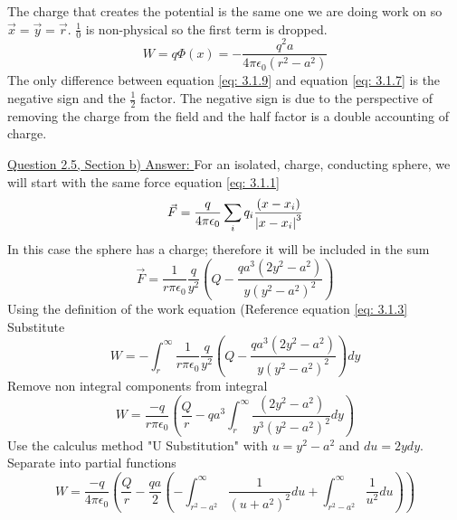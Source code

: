 \documentclass[12pt]{article}
\begin{document}
    The charge that creates the potential is the same one we are doing work on so $\vec{x} = \vec{y} = \vec{r}$. $\frac{1}{0}$ is non-physical so the first term is dropped.
    \begin{equation} \label{eq: 3.1.9}
        W = q \Phi(x) = -\frac{q^2 a}{4 \pi \epsilon_0 (r^2 - a^2)} 
    \end{equation}
    The only difference between equation \ref{eq: 3.1.9} and equation \ref{eq: 3.1.7} is the negative sign and the $\frac{1}{2}$ factor. The negative sign is due to the perspective of removing the charge from the field and the half factor is a double accounting of charge.

    \underline{Question 2.5, Section b) Answer: }
    \newline 
    For an isolated, charge, conducting sphere, we will start with the same force equation \ref{eq: 3.1.1}
    \begin{gather*}
        \vec{F} = \frac{q}{4 \pi \epsilon_0} \sum_i q_i \frac{(x-x_i)}{\abs{x-x_i}^3}
    \end{gather*}
    In this case the sphere has a charge; therefore it will be included in the sum
    \begin{equation} \label{eq: 3.2.1}
        \vec{F} = \frac{1}{r \pi \epsilon_0} \frac{q}{y^2} \left(Q - \frac{q a^3 (2 y^2 - a^2)}{y (y^2 - a^2)^2} \right)
    \end{equation}
    Using the definition of the work equation (Reference equation \ref{eq: 3.1.3}
    \newline Substitute 
    \begin{equation} \label{eq: 3.2.2}
        W = -\int_r^\infty \frac{1}{r \pi \epsilon_0} \frac{q}{y^2} \left(Q - \frac{q a^3 (2 y^2 - a^2)}{y (y^2 - a^2)^2} \right) dy
    \end{equation}
    Remove non integral components from integral
    \begin{equation} \label{eq: 3.2.3}
        W =  \frac{-q}{r \pi \epsilon_0} \left(\frac{Q}{r} - q a^3 \int_r^\infty \frac{(2 y^2 - a^2)}{y^3 (y^2 - a^2)^2} dy\right)
    \end{equation}    
    Use the calculus method "U Substitution" with $u=y^2 - a^2$ and $du=2ydy$. 
    \newline Separate into partial functions
    \begin{equation} \label{eq: 3.2.4}
        W = \frac{-q}{4 \pi \epsilon_0} \left(\frac{Q}{r} - \frac{qa}{2} \left(- \int_{r^2 - a^2}^\infty \frac{1}{(u+a^2)^2}du + \int_{r^2 - a^2}^\infty \frac{1}{u^2} du \right) \right)
    \end{equation}
\end{document}
